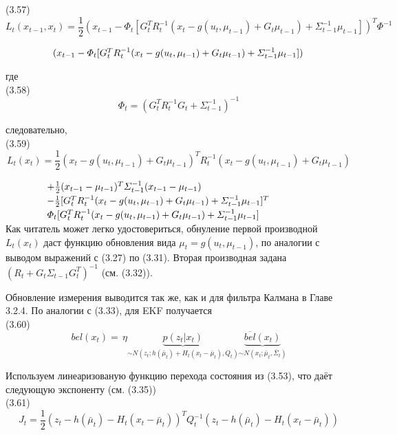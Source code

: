 \documentclass[10pt,a4paper]{article}
\begin{document}
(3.57)
$$L_t(x_{t-1},x_t)=\frac{1}{2}(x_{t-1}-\varPhi_t[G_t^T R_t^{-1}(x_t-g(u_t,\mu_{t-1})+G_t\mu_{t-1})+\varSigma_{t-1}^{-1}\mu_{t-1}])^T \varPhi^{-1}$$

$\hspace{17mm}(x_{t-1}-\varPhi_t[G_t^T R_t^{-1}(x_t-g(u_t,\mu_{t-1})+G_t\mu_{t-1})+\varSigma_{t-1}^{-1}\mu_{t-1}])$

где\\

(3.58)
$$\varPhi_t=(G_t^T R_t^{-1}G_t+\varSigma_{t-1}^{-1})^{-1}$$

следовательно,\\

(3.59)
$$L_t(x_t)=\frac{1}{2}(x_t-g(u_t,\mu_{t-1})+G_t\mu_{t-1})^T R_t^{-1}(x_t-g(u_t,\mu_{t-1})+G_t \mu_{t-1})$$

$\hspace{15mm}+\frac{1}{2}(x_{t-1}-\mu_{t-1})^T \varSigma_{t-1}^{-1}(x_{t-1}-\mu_{t-1})$\\

$\hspace{15mm}-\frac{1}{2}[G_t^T R_t^{-1}(x_t-g(u_t,\mu_{t-1})+G_t\mu_{t-1})+\varSigma_{t-1}^{-1}\mu_{t-1}]^T$\\

$\hspace{15mm}\varPhi_t[G_t^T R_t^{-1}(x_t-g(u_t,\mu_{t-1})+G_t\mu_{t-1})+\varSigma_{t-1}^{-1}\mu_{t-1}]$\\

Как читатель может легко удостовериться, обнуление первой производной $L_t(x_t)$ даст функцию обновления вида $\mu_t = g(u_t,\mu_{t-1})$, по аналогии с выводом выражений с (3.27) по (3.31). Вторая производная задана $(R_t + G_t\varSigma_{t-1} G_t^T)^{-1}$ (см. (3.32)).

Обновление измерения выводится так же, как и для фильтра Калмана в Главе 3.2.4. По аналогии с (3.33), для EKF получается\\

(3.60)
$$bel(x_t)=\,\eta\underbrace{p(z_t|x_t)}_{\sim N(z_t;h(\bar{\mu}_t)+H_t(x_t-\bar{\mu}_t),Q_t)}\underbrace{\overline{bel}(x_t)}_{\sim N(x_t;\bar{\mu}_t,\bar{\varSigma}_t)}$$

Используем линеаризованую функцию перехода состояния из (3.53), что даёт следующую экспоненту (см. (3.35))\\

(3.61)
$$J_t=\frac{1}{2}(z_t-h(\bar{\mu}_t)-H_t(x_t-\bar{\mu}_t))^T Q_t^{-1}(z_t-h(\bar{\mu}_t)-H_t(x_t-\bar{\mu}_t))$$\\
\end{document}
